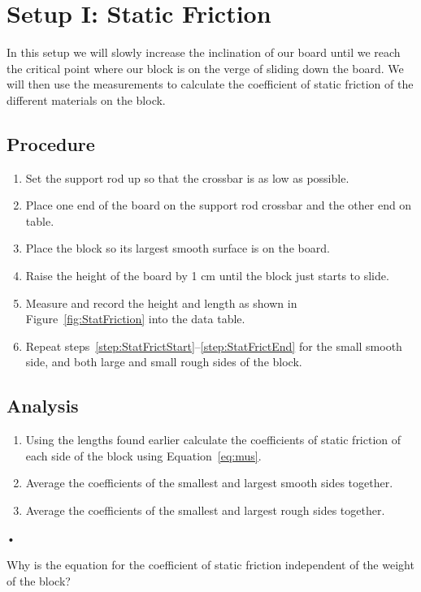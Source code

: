 \documentclass[main.tex]{subfiles}
\begin{document}
\section{Setup I: Static Friction}
In this setup we will slowly increase the inclination of our board until we reach the critical point where our block is on the verge of sliding down the board. We will then use the measurements to calculate the coefficient of static friction of the different materials on the block.

\subsection*{Procedure}
\begin{enumerate}
\item \label{step:StatFrictStart}
Set the support rod up so that the crossbar is as low as possible.
\item
Place one end of the board on the support rod crossbar and the other end on table.
\item
Place the block so its largest smooth surface is on the board.
\item
Raise the height of the board by 1 cm until the block just starts to slide.
\item\label{step:StatFrictEnd}
Measure and record the height and length as shown in Figure~\ref{fig:StatFriction} into the data table.
\item
Repeat steps~\ref{step:StatFrictStart}--\ref{step:StatFrictEnd} for the small smooth side, and both large and small rough sides of the block.
\end{enumerate}

\subsection*{Analysis}
\begin{enumerate}
\item 
Using the lengths found earlier calculate the coefficients of static friction of each side of the block using Equation~\eqref{eq:mus}.
\item
Average the coefficients of the smallest and largest smooth sides together.
\item
Average the coefficients of the smallest and largest rough sides together.
\end{enumerate}•

\begin{question}
Why is the equation for the coefficient of static friction independent of the weight of the block?
\end{question}
\end{document}
